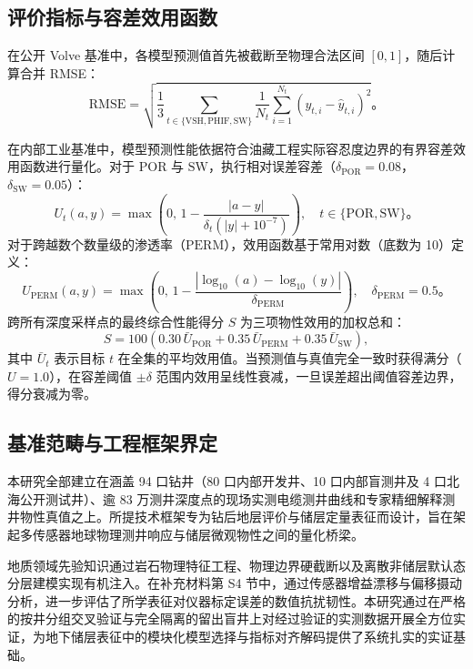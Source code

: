 \documentclass[preprint,12pt,nopreprintline]{elsarticle}
\begin{document}
\subsection{评价指标与容差效用函数}
在公开 Volve 基准中，各模型预测值首先被截断至物理合法区间 $[0, 1]$，随后计算合并 RMSE：
\begin{equation}
\mathrm{RMSE} = \sqrt{\frac{1}{3} \sum_{t \in \{\mathrm{VSH}, \mathrm{PHIF}, \mathrm{SW}\}} \frac{1}{N_t} \sum_{i=1}^{N_t} (y_{t,i} - \hat{y}_{t,i})^2}。
\end{equation}

在内部工业基准中，模型预测性能依据符合油藏工程实际容忍度边界的有界容差效用函数进行量化。对于 $\mathrm{POR}$ 与 $\mathrm{SW}$，执行相对误差容差（$\delta_{\mathrm{POR}} = 0.08$，$\delta_{\mathrm{SW}} = 0.05$）：
\begin{equation}
U_t(a, y) = \max\left(0,\, 1 - \frac{|a - y|}{\delta_t (|y| + 10^{-7})}\right), \quad t \in \{\mathrm{POR}, \mathrm{SW}\}。
\end{equation}
对于跨越数个数量级的渗透率（$\mathrm{PERM}$），效用函数基于常用对数（底数为 10）定义：
\begin{equation}
U_{\mathrm{PERM}}(a, y) = \max\left(0,\, 1 - \frac{|\log_{10}(a) - \log_{10}(y)|}{\delta_{\mathrm{PERM}}}\right), \quad \delta_{\mathrm{PERM}} = 0.5。
\end{equation}
跨所有深度采样点的最终综合性能得分 $S$ 为三项物性效用的加权总和：
\begin{equation}
S = 100 \left(0.30\,\bar{U}_{\mathrm{POR}} + 0.35\,\bar{U}_{\mathrm{PERM}} + 0.35\,\bar{U}_{\mathrm{SW}}\right),
\end{equation}
其中 $\bar{U}_t$ 表示目标 $t$ 在全集的平均效用值。当预测值与真值完全一致时获得满分（$U=1.0$），在容差阈值 $\pm \delta$ 范围内效用呈线性衰减，一旦误差超出阈值容差边界，得分衰减为零。

\subsection{基准范畴与工程框架界定}
本研究全部建立在涵盖 94 口钻井（80 口内部开发井、10 口内部盲测井及 4 口北海公开测试井）、逾 83 万测井深度点的现场实测电缆测井曲线和专家精细解释测井物性真值之上。所提技术框架专为钻后地层评价与储层定量表征而设计，旨在架起多传感器地球物理测井响应与储层微观物性之间的量化桥梁。

地质领域先验知识通过岩石物理特征工程、物理边界硬截断以及离散非储层默认态分层建模实现有机注入。在补充材料第 S4 节中，通过传感器增益漂移与偏移摄动分析，进一步评估了所学表征对仪器标定误差的数值抗扰韧性。本研究通过在严格的按井分组交叉验证与完全隔离的留出盲井上对经过验证的实测数据开展全方位实证，为地下储层表征中的模块化模型选择与指标对齐解码提供了系统扎实的实证基础。
\end{document}
